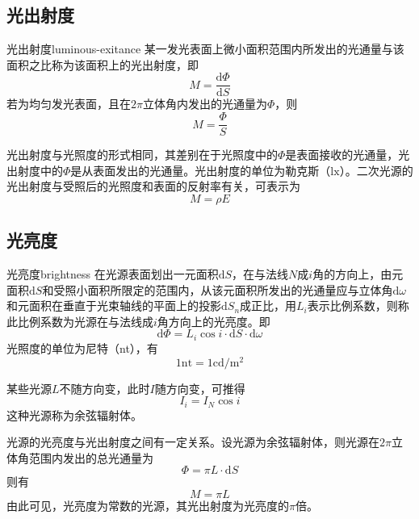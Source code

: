 \documentclass[cn,10pt,chinesefont=founder,math=newtx,cite=super,twoside]{elegantbook}
\begin{document}
\subsection{光出射度}
\begin{definition}{光出射度}{luminous-exitance}
某一发光表面上微小面积范围内所发出的光通量与该面积之比称为该面积上的光出射度，即
\begin{equation}
M=\frac{\mathrm{d}\varPhi}{\mathrm{d}S}
\end{equation}
若为均匀发光表面，且在$2\pi$立体角内发出的光通量为$\varPhi$，则
\begin{equation}
M=\frac{\varPhi}{S}
\end{equation}
\end{definition}
光出射度与光照度的形式相同，其差别在于光照度中的$\varPhi$是表面接收的光通量，光出射度中的$\varPhi$是从表面发出的光通量。光出射度的单位为勒克斯（$\mathrm{lx}$）。二次光源的光出射度与受照后的光照度和表面的反射率有关，可表示为
\begin{equation}
M=\rho E
\label{eq:luminous-exitance}
\end{equation}

\subsection{光亮度}
\begin{definition}{光亮度}{brightness}
	在光源表面划出一元面积$\mathrm{d}S$，在与法线$N$成$i$角的方向上，由元面积$\mathrm{d}S$和受照小面积所限定的范围内，从该元面积所发出的光通量应与立体角$\mathrm{d}\omega$和元面积在垂直于光束轴线的平面上的投影$\mathrm{d}S_n$成正比，用$L_i$表示比例系数，则称此比例系数为光源在与法线成$i$角方向上的光亮度。即
	\begin{equation}
	\mathrm{d}\varPhi=L_i\cos i\cdot\mathrm{d}S\cdot\mathrm{d}\omega
	\end{equation}
	光照度的单位为尼特（nt），有
	\begin{equation}
	1\mathrm{nt}=1\mathrm{cd/m^2}
	\end{equation}
\end{definition}
某些光源$L$不随方向变，此时$I$随方向变，可推得
\begin{equation}
I_i=I_N\cos i
\end{equation}
这种光源称为余弦辐射体。

光源的光亮度与光出射度之间有一定关系。设光源为余弦辐射体，则光源在$2\pi$立体角范围内发出的总光通量为
\begin{equation}
\varPhi=\pi L\cdot\mathrm{d}S
\end{equation}
则有
\begin{equation}
M=\pi L
\end{equation}
由此可见，光亮度为常数的光源，其光出射度为光亮度的$\pi$倍。
\end{document}
